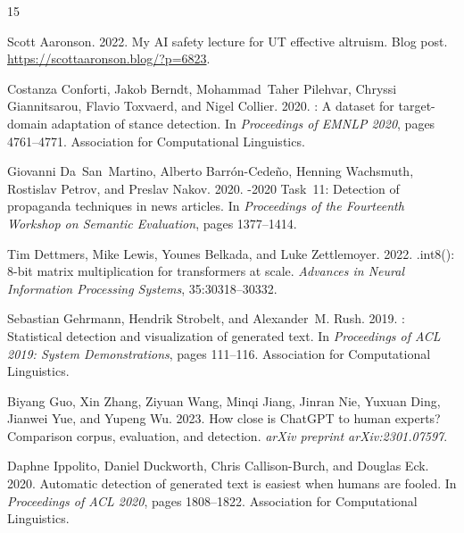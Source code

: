 \documentclass[11pt]{article}
\begin{document}
\begin{thebibliography}{15}

Scott Aaronson. 2022.
\newblock My {AI} safety lecture for {UT} effective altruism.
\newblock Blog post. \url{https://scottaaronson.blog/?p=6823}.

Costanza Conforti, Jakob Berndt, Mohammad~Taher Pilehvar, Chryssi
  Giannitsarou, Flavio Toxvaerd, and Nigel Collier. 2020.
: A dataset for target-domain adaptation of stance detection.
\newblock In \emph{Proceedings of EMNLP 2020}, pages 4761--4771. Association
  for Computational Linguistics.

Giovanni Da~San~Martino, Alberto Barr{\'o}n-Cede{\~n}o, Henning Wachsmuth,
  Rostislav Petrov, and Preslav Nakov. 2020.
-2020 Task~11: Detection of propaganda techniques in news
  articles.
\newblock In \emph{Proceedings of the Fourteenth Workshop on Semantic
  Evaluation}, pages 1377--1414.

Tim Dettmers, Mike Lewis, Younes Belkada, and Luke Zettlemoyer. 2022.
.int8(): 8-bit matrix multiplication for transformers at scale.
\newblock \emph{Advances in Neural Information Processing Systems},
  35:30318--30332.

Sebastian Gehrmann, Hendrik Strobelt, and Alexander~M. Rush. 2019.
: Statistical detection and visualization of generated text.
\newblock In \emph{Proceedings of ACL 2019: System Demonstrations}, pages
  111--116. Association for Computational Linguistics.

Biyang Guo, Xin Zhang, Ziyuan Wang, Minqi Jiang, Jinran Nie, Yuxuan Ding,
  Jianwei Yue, and Yupeng Wu. 2023.
\newblock How close is {ChatGPT} to human experts? {C}omparison corpus,
  evaluation, and detection.
\newblock \emph{arXiv preprint arXiv:2301.07597}.

Daphne Ippolito, Daniel Duckworth, Chris Callison-Burch, and Douglas Eck.
  2020.
\newblock Automatic detection of generated text is easiest when humans are
  fooled.
\newblock In \emph{Proceedings of ACL 2020}, pages 1808--1822. Association for
  Computational Linguistics.


\end{thebibliography}
\end{document}
